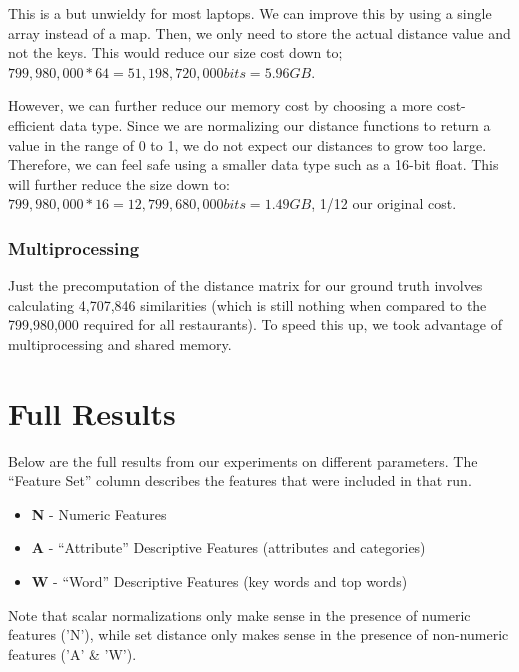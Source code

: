 \documentclass{article}
\begin{document}
This is a but unwieldy for most laptops.
We can improve this by using a single array instead of a map.
Then, we only need to store the actual distance value and not the keys.
This would reduce our size cost down to;
$ 799,980,000 * 64 = 51,198,720,000 bits = 5.96 GB $.

However, we can further reduce our memory cost by choosing a more cost-efficient data type.
Since we are normalizing our distance functions to return a value in the range of 0 to 1, we do not expect our distances to grow too large.
Therefore, we can feel safe using a smaller data type such as a 16-bit float.
This will further reduce the size down to:
$ 799,980,000 * 16 = 12,799,680,000 bits = 1.49 GB $, 1/12 our original cost.

\subsubsection{Multiprocessing}
Just the precomputation of the distance matrix for our ground truth involves calculating 4,707,846 similarities (which is still nothing when compared to the 799,980,000 required for all restaurants).
To speed this up, we took advantage of multiprocessing and shared memory.

\section{Full Results}
\label{appendix:full-results}

Below are the full results from our experiments on different parameters.
The ``Feature Set'' column describes the features that were included in that run.
\begin{itemize}
	\item \textbf{N} - Numeric Features
	\item \textbf{A} - ``Attribute'' Descriptive Features (attributes and categories)
	\item \textbf{W} - ``Word'' Descriptive Features (key words and top words)
\end{itemize}

Note that scalar normalizations only make sense in the presence of numeric features ('N'),
while set distance only makes sense in the presence of non-numeric features ('A' \& 'W').
\end{document}
